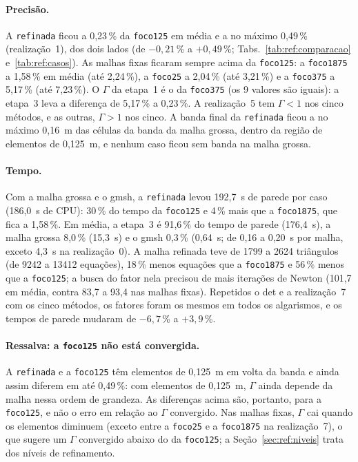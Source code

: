 \begin{table}[htbp]
  \centering\small\setlength{\tabcolsep}{4pt}
  \caption{$\Gamma$ de cada caso e método e, entre parênteses, a diferença para a \texttt{foco125}. r$i$ é a realização
    $i$.}
  \label{tab:ref:casos}
  
\end{table}

\paragraph{Precisão.} A \texttt{refinada} ficou a 0,23\,\% da \texttt{foco125} em média e a no máximo 0,49\,\%
(realização~1), dos dois lados (de $-0{,}21$\,\% a $+0{,}49$\,\%; Tabs.~\ref{tab:ref:comparacao}
e~\ref{tab:ref:casos}). As malhas fixas ficaram sempre acima da \texttt{foco125}: a \texttt{foco1875} a 1,58\,\% em
média (até 2,24\,\%), a \texttt{foco25} a 2,04\,\% (até 3,21\,\%) e a \texttt{foco375} a 5,17\,\% (até 7,23\,\%). O
$\Gamma$ da etapa~1 é o da \texttt{foco375} (os 9 valores são iguais): a etapa~3 leva a diferença de 5,17\,\% a
0,23\,\%. A realização~5 tem $\Gamma < 1$ nos cinco métodos, e as outras, $\Gamma > 1$ nos cinco. A banda final da
\texttt{refinada} ficou a no máximo 0,16~m das células da banda da malha grossa, dentro da região de elementos de
0,125~m, e nenhum caso ficou sem banda na malha grossa.

\paragraph{Tempo.} Com a malha grossa e o gmsh, a \texttt{refinada} levou 192,7~s de parede por caso (186,0~s de CPU):
30\,\% do tempo da \texttt{foco125} e 4\,\% mais que a \texttt{foco1875}, que fica a 1,58\,\%. Em média, a etapa~3 é
91,6\,\% do tempo de parede (176,4~s), a malha grossa 8,0\,\% (15,3~s) e o gmsh 0,3\,\% (0,64~s; de 0,16 a
0,20~s por malha, exceto 4,3~s na realização~0). A malha refinada teve
de 1799 a 2624 triângulos (de 9242 a 13412 equações), 18\,\% menos equações que a \texttt{foco1875} e 56\,\% menos que a
\texttt{foco125}; a busca do fator nela precisou de mais iterações de Newton (101,7 em média, contra 83,7 a 93,4 nas
malhas fixas). Repetidos o det e a realização~7 com os cinco métodos, os fatores foram os mesmos em todos os
algarismos, e os tempos de parede mudaram de $-6{,}7$\,\% a $+3{,}9$\,\%.

\paragraph{Ressalva: a \texttt{foco125} não está convergida.} A \texttt{refinada} e a \texttt{foco125} têm elementos de
0,125~m em volta da banda e ainda assim diferem em até 0,49\,\%: com elementos de 0,125~m, $\Gamma$ ainda depende da
malha nessa ordem de grandeza. As diferenças acima são, portanto, para a \texttt{foco125}, e não o erro em relação ao $\Gamma$ convergido. Nas
malhas fixas, $\Gamma$ cai quando os elementos diminuem (exceto entre a \texttt{foco25} e a \texttt{foco1875} na
realização~7), o que sugere um $\Gamma$ convergido abaixo do da \texttt{foco125}; a Seção~\ref{sec:ref:niveis} trata
dos níveis de refinamento.

